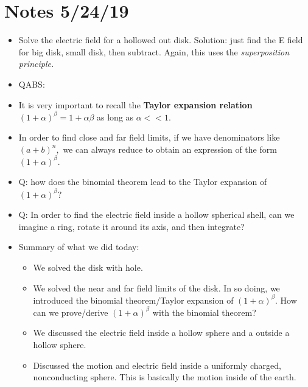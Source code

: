 \documentclass[12pt]{extreport}
\begin{document}

\section{Notes 5/24/19}
\begin{itemize}
	\item Solve the electric field for a hollowed out disk. Solution: just find the E field for big disk, small disk, then subtract. Again, this uses the \textit{superposition principle.}

	\item QABS: 

	\item It is very important to recall the \textbf{Taylor expansion relation} $(1 + \alpha)^\beta = 1+ \alpha \beta$ as long as $\alpha << 1.$

	\item In order to find close and far field limits, if we have denominators like $(a + b)^n,$ we can always reduce to obtain an expression of the form $(1 + \alpha)^\beta.$

	\item Q: how does the binomial theorem lead to the Taylor expansion of $(1+\alpha)^\beta?$

	\item Q: In order to find the electric field inside a hollow spherical shell, can we imagine a ring, rotate it around its axis, and then integrate? 

	\item Summary of what we did today:
		\begin{itemize}
			\item We solved the disk with hole.
			\item We solved the near and far field limits of the disk. In so doing, we introduced the binomial theorem/Taylor expansion of $(1+\alpha)^\beta.$ How can we prove/derive $(1+\alpha)^\beta$ with the binomial theorem?
			\item We discussed the electric field inside a hollow sphere and a outside a hollow sphere. 
			\item Discussed the motion and electric field inside a uniformly charged, nonconducting sphere. This is basically the motion inside of the earth. 


\end{itemize}
\end{itemize}
\end{document}
